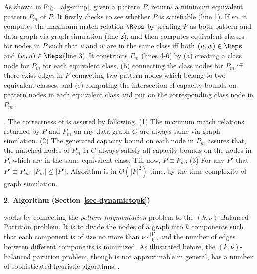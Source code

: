 {As shown in Fig.~\ref{alg-minp}, given a pattern $P$, \minp returns a minimum equivalent pattern $P_m$ of $P$.
It firstly checks to see whether $P$ is satisfiable (line 1).
If so, it computes the maximum match relation $\Reps$ by treating $P$ as both pattern and data graph via graph simulation (line 2),
and then computes equivalent classes for nodes in $P$ such that $u$ and $w$ are in the same class iff both $(u, w)\in \Reps$ and $(w, u)\in \Reps$(line 3).
It constructs $P_m$ (lines 4-6) by
(a) creating a class node for $P_m$ for each equivalent class,
(b) connecting the class nodes for $P_m$ iff there exist edges in $P$ connecting two pattern nodes which belong to two equivalent classes, and
(c) computing the intersection of capacity bounds on pattern nodes in each equivalent class and put on the corresponding class node in $P_m$.

\vspace{-2ex}
. The correctness of \minp is assured by following.
(1) The maximum match relations returned by $P$ and $P_{m}$ on any data graph $G$ are always same via graph simulation.
(2) The generated capacity bound on each node in $P_{m}$ assures that, the matched nodes of $P_{m}$ in $G$ always satisfy all capacity bounds on the nodes in $P$, which are in the same equivalent class.
Till now, $P\equiv P_{m}$;
(3) For any $P'$ that $P'\equiv P_{m}$, $|P_{m}|\leq|P'|$.
Algorithm \minp is in $O(|P|^2)$ time, by the time complexity of graph simulation.
}%

\noindent
{\textbf{2. Algorithm  (Section~\ref{sec-dynamictopk})}}

 works by connecting the {\em pattern fragmentation} problem to the
{\sc $(k, \nu)$-Balanced Partition} problem.
It is to divide the nodes of a graph into $k$ components such that each component is of size no more than $\nu\cdot\frac{|V|}{k}$, and the number of edges between different components is minimized.
As illustrated before, the $(k,\nu)$-balanced partition problem,
though is not approximable in general, has a number of sophisticated heuristic algorithms~\cite{AndreevR06}.

